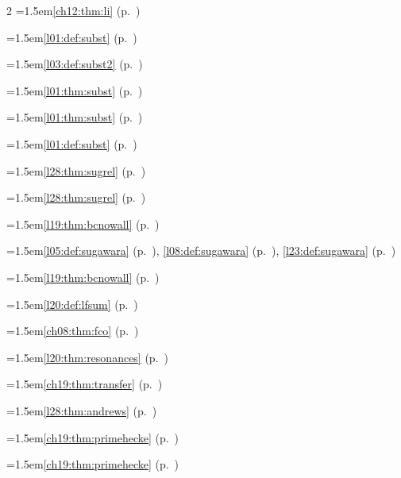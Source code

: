 \begin{multicols}{2}
\hangindent=1.5em\quad \ref{ch12:thm:li} (p.~\pageref{ch12:thm:li})\par
\hangindent=1.5em\quad \ref{l01:def:subst} (p.~\pageref{l01:def:subst})\par
\hangindent=1.5em\quad \ref{l03:def:subst2} (p.~\pageref{l03:def:subst2})\par
\hangindent=1.5em\quad \ref{l01:thm:subst} (p.~\pageref{l01:thm:subst})\par
\hangindent=1.5em\quad \ref{l01:thm:subst} (p.~\pageref{l01:thm:subst})\par
\hangindent=1.5em\quad \ref{l01:def:subst} (p.~\pageref{l01:def:subst})\par
\hangindent=1.5em\quad \ref{l28:thm:sugrel} (p.~\pageref{l28:thm:sugrel})\par
\hangindent=1.5em\quad \ref{l28:thm:sugrel} (p.~\pageref{l28:thm:sugrel})\par
\hangindent=1.5em\quad \ref{l19:thm:bcnowall} (p.~\pageref{l19:thm:bcnowall})\par
\hangindent=1.5em\quad \ref{l05:def:sugawara} (p.~\pageref{l05:def:sugawara}), \ref{l08:def:sugawara} (p.~\pageref{l08:def:sugawara}), \ref{l23:def:sugawara} (p.~\pageref{l23:def:sugawara})\par
\hangindent=1.5em\quad \ref{l19:thm:bcnowall} (p.~\pageref{l19:thm:bcnowall})\par
\hangindent=1.5em\quad \ref{l20:def:lfsum} (p.~\pageref{l20:def:lfsum})\par
\hangindent=1.5em\quad \ref{ch08:thm:fco} (p.~\pageref{ch08:thm:fco})\par
\hangindent=1.5em\quad \ref{l20:thm:resonances} (p.~\pageref{l20:thm:resonances})\par
\hangindent=1.5em\quad \ref{ch19:thm:transfer} (p.~\pageref{ch19:thm:transfer})\par
\hangindent=1.5em\quad \ref{l28:thm:andrews} (p.~\pageref{l28:thm:andrews})\par
\hangindent=1.5em\quad \ref{ch19:thm:primehecke} (p.~\pageref{ch19:thm:primehecke})\par
\hangindent=1.5em\quad \ref{ch19:thm:primehecke} (p.~\pageref{ch19:thm:primehecke})\par

\end{multicols}
